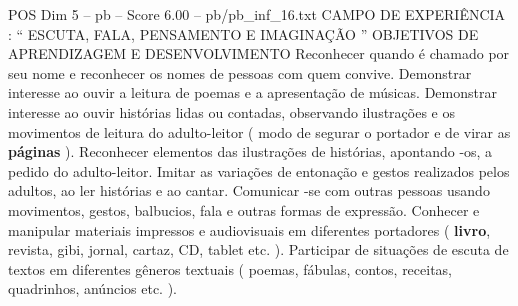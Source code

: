 \begin{textsample}{POS Dim 5 – pb – Score 6.00 – pb/pb\_inf\_16.txt}  \label{ex:f5_pos_099}
CAMPO DE EXPERIÊNCIA : “ ESCUTA, FALA, PENSAMENTO E IMAGINAÇÃO ” OBJETIVOS DE APRENDIZAGEM E DESENVOLVIMENTO Reconhecer quando é chamado por seu nome e reconhecer os nomes de pessoas com quem convive.
Demonstrar interesse ao ouvir a leitura de poemas e a apresentação de músicas.
Demonstrar interesse ao ouvir histórias lidas ou contadas, observando ilustrações e os movimentos de leitura do adulto-leitor ( modo de segurar o portador e de virar as \textbf{páginas} ).
Reconhecer elementos das ilustrações de histórias, apontando -os, a pedido do adulto-leitor.
Imitar as variações de entonação e gestos realizados pelos adultos, ao ler histórias e ao cantar.
Comunicar -se com outras pessoas usando movimentos, gestos, balbucios, fala e outras formas de expressão.
Conhecer e manipular materiais impressos e audiovisuais em diferentes portadores ( \textbf{livro}, revista, gibi, jornal, cartaz, CD, tablet etc. ).
Participar de situações de escuta de textos em diferentes gêneros textuais ( poemas, fábulas, contos, receitas, quadrinhos, anúncios etc. ).

\end{textsample}
